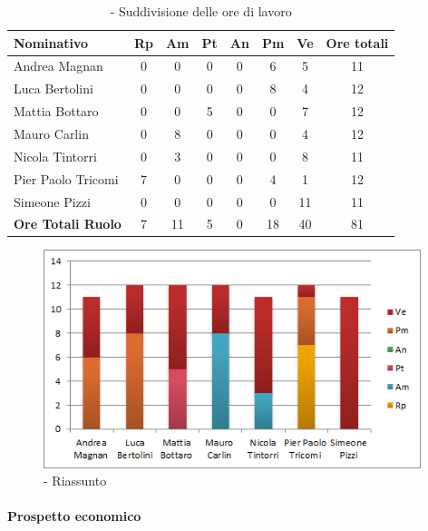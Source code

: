 \documentclass[../PianoDiProgetto.tex]{subfiles}
\begin{document}
	\begin{table}[H]
		\begin{tabularx}{\textwidth}{l  * {6}{c}  c}
			\toprule
			\textbf{Nominativo} & \textbf{Rp} & \textbf{Am} & \textbf{Pt} 
						& \textbf{An} & \textbf{Pm} & \textbf{Ve} & \textbf{Ore totali} \\
			\midrule
			Andrea Magnan  & 0 & 0 & 0 & 0 & 6 & 5 & 11 \\
			Luca Bertolini  & 0 & 0 & 0 & 0 & 8 & 4 & 12 \\
			Mattia Bottaro  & 0 & 0 & 5 & 0 & 0 & 7 & 12 \\
			Mauro Carlin  & 0 & 8 & 0 & 0 & 0 & 4 & 12 \\
			Nicola Tintorri  & 0 & 3 & 0 & 0 & 0 & 8 & 11 \\
			Pier Paolo Tricomi  & 7 & 0 & 0 & 0 & 4 & 1 & 12 \\
			Simeone Pizzi & 0 & 0 & 0 & 0 & 0 & 11 & 11 \\
			\midrule
			\textbf{Ore Totali Ruolo} & 7 & 11 & 5 & 0 & 18 & 40 & 81 \\
			\bottomrule
		\end{tabularx}
		\caption{\PerV{} - Suddivisione delle ore di lavoro}
	\end{table}
\vfill	

	
	\begin{figure}[H]
		\centering
		\includegraphics[width=11cm, trim=1cm 0cm 1cm 0cm]{grafici/V-persona}
			\caption{\PerV{} - Riassunto}
	\end{figure}
	
\vspace{35 mm}	
	\paragraph{Prospetto economico}\
					
\end{document}

